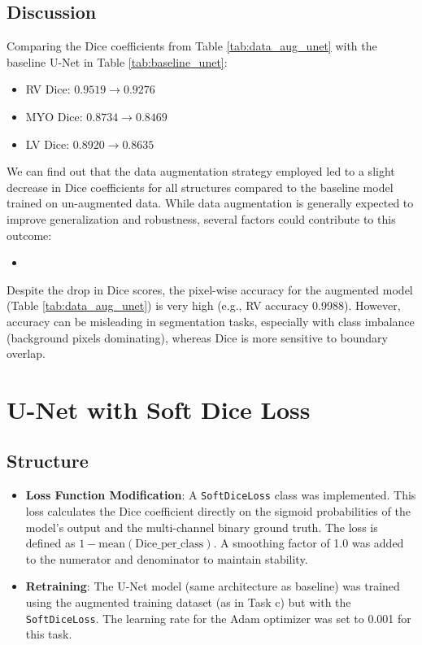 \documentclass{article}
\begin{document}
\subsection{Discussion}
Comparing the Dice coefficients from Table \ref{tab:data_aug_unet} with the baseline U-Net in Table \ref{tab:baseline_unet}:
\begin{itemize}
  \item RV Dice: $0.9519 \rightarrow 0.9276$
  \item MYO Dice: $0.8734 \rightarrow 0.8469$
  \item LV Dice: $0.8920 \rightarrow 0.8635$
\end{itemize}
We can find out that the data augmentation strategy employed led to a slight decrease in Dice coefficients for all structures compared to the
baseline model trained on un-augmented data. While data augmentation is generally expected to improve generalization and robustness,
several factors could contribute to this outcome:
\begin{itemize}
  \item
\end{itemize}
Despite the drop in Dice scores, the pixel-wise accuracy for the augmented model (Table \ref{tab:data_aug_unet}) is very high
(e.g., RV accuracy 0.9988). However, accuracy can be misleading in segmentation tasks, especially with class imbalance
(background pixels dominating), whereas Dice is more sensitive to boundary overlap.



\section{U-Net with Soft Dice Loss}

\subsection{Structure}
\begin{itemize}
  \item \textbf{Loss Function Modification}: A \texttt{SoftDiceLoss} class was implemented. This loss calculates the Dice
        coefficient directly on the sigmoid probabilities of the model's output and the multi-channel binary ground truth. The
        loss is defined as $1 - \text{mean}(\text{Dice\_per\_class})$. A smoothing factor of 1.0 was added to the numerator and
        denominator to maintain stability.
  \item \textbf{Retraining}: The U-Net model (same architecture as baseline) was trained using the augmented training
        dataset (as in Task c) but with the \texttt{SoftDiceLoss}. The learning rate for the Adam optimizer was set to 0.001 for this task.
\end{itemize}
\end{document}
